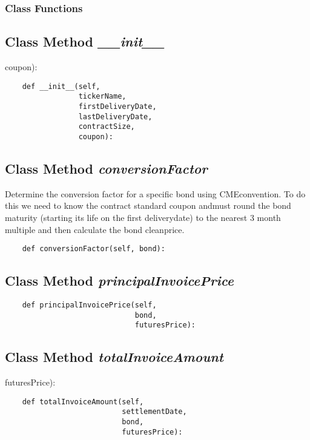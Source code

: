 \documentclass[twoside,11pt]{book}
\begin{document}
\subsubsection{Class Functions}

\subsection{Class Method {\it \_\_init\_\_}}
coupon):

\begin{lstlisting}
    def __init__(self,
                 tickerName,
                 firstDeliveryDate,
                 lastDeliveryDate,
                 contractSize,
                 coupon):
\end{lstlisting}

\subsection{Class Method {\it conversionFactor}}
Determine the conversion factor for a specific bond using CMEconvention. To do this we need to know the contract standard coupon andmust round the bond maturity (starting its life on the first deliverydate) to the nearest 3 month multiple and then calculate the bond cleanprice. 

\begin{lstlisting}
    def conversionFactor(self, bond):
\end{lstlisting}

\subsection{Class Method {\it principalInvoicePrice}}


\begin{lstlisting}
    def principalInvoicePrice(self,
                              bond,
                              futuresPrice):
\end{lstlisting}

\subsection{Class Method {\it totalInvoiceAmount}}
futuresPrice):

\begin{lstlisting}
    def totalInvoiceAmount(self,
                           settlementDate,
                           bond,
                           futuresPrice):
\end{lstlisting}
\end{document}
